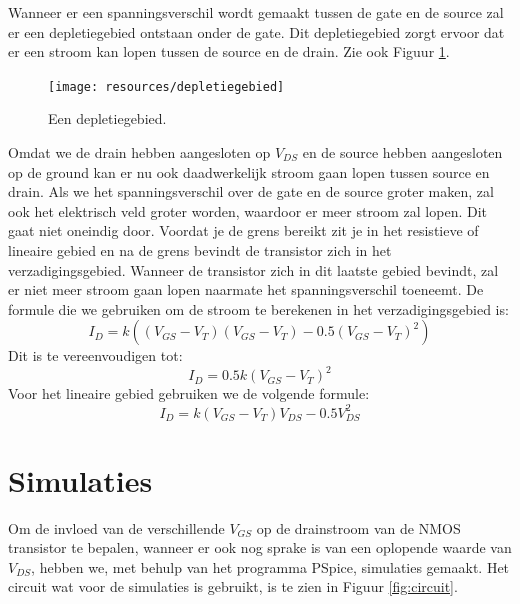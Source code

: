 \documentclass{scrartcl}  %
\begin{document}
Wanneer er een spanningsverschil wordt gemaakt tussen de gate en de source zal er een depletiegebied ontstaan onder de gate. 
Dit depletiegebied zorgt ervoor dat er een stroom kan lopen tussen de source en de drain. 
Zie ook Figuur \ref{fig:depletiegebied}.
\begin{figure}[H]
\centering
	\texttt{[image: resources/depletiegebied]}
	\caption{Een depletiegebied.\cite{nick-slides}}
	\label{fig:depletiegebied}
\end{figure}
Omdat we de drain hebben aangesloten op $V_{DS}$ en de source hebben aangesloten op de ground kan er nu ook daadwerkelijk stroom gaan lopen tussen source en drain. 
Als we het spanningsverschil over de gate en de source groter maken, zal ook het elektrisch veld groter worden, waardoor er meer stroom zal lopen. 
Dit gaat niet oneindig door. 
Voordat je de grens bereikt zit je in het resistieve of lineaire gebied en na de grens bevindt de transistor zich in het verzadigingsgebied. 
Wanneer de transistor zich in dit laatste gebied bevindt, zal er niet meer stroom gaan lopen naarmate het spanningsverschil toeneemt. 
De formule die we gebruiken om de stroom te berekenen in het verzadigingsgebied is:
\begin{equation}
I_{D} = k((V_{GS} - V_{T})(V_{GS} - V_{T}) - 0.5(V_{GS} - V_{T})^{2})
\end{equation}
\newline Dit is te vereenvoudigen tot: 
\begin{equation} I_{D} = 0.5k(V_{GS} - V_{T})^{2}
\end{equation}
\newline Voor het lineaire gebied gebruiken we de volgende formule: 
\begin{equation}
I_{D} = k(V_{GS} - V_{T})V_{DS} - 0.5V_{DS}^{2}
\end{equation}
\section{Simulaties}
Om de invloed van de verschillende $V_{GS}$ op de drainstroom van de NMOS transistor te bepalen, wanneer er ook nog sprake is van een oplopende waarde van $V_{DS}$, hebben we, met behulp van het programma PSpice, simulaties gemaakt. 
Het circuit wat voor de simulaties is gebruikt, is te zien in Figuur \ref{fig:circuit}. 
\end{document}
